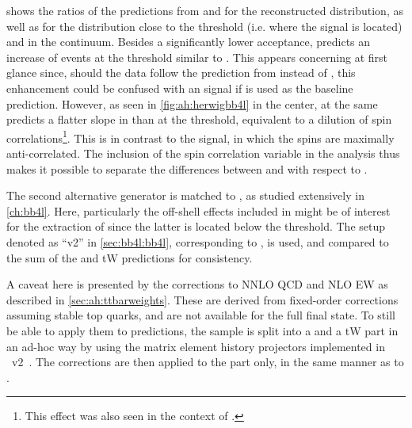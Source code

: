  shows the ratios of the predictions from \herwig and \pythia for the reconstructed \mtt distribution, as well as for the \chel distribution close to the \ttbar threshold (i.e. where the \etat signal is located) and in the \ttbar continuum. Besides a significantly lower \ttbar acceptance, \herwig predicts an increase of events at the \ttbar threshold similar to \etat.
This appears concerning at first glance since, should the data follow the prediction from \herwig instead of \pythia, this enhancement could be confused with an \etat signal if \pythia is used as the baseline prediction.
However, as seen in \cref{fig:ah:herwigbb4l} in the center, \herwig at the same predicts a flatter slope in \chel than \pythia at the \ttbar threshold, equivalent to a dilution of \ttbar spin correlations\footnote{This effect was also seen in the context of .}. This is in contrast to the \etat signal, in which the \ttbar spins are maximally anti-correlated. The inclusion of the spin correlation variable \chel in the analysis thus makes it possible to separate the differences between \powheg and \herwig with respect to \etat.

The second alternative generator is \bbfourl matched to \pythia, as studied extensively in \cref{ch:bb4l}. Here, particularly the off-shell effects included in \bbfourl might be of interest for the extraction of \etat since the latter is located below the \ttbar threshold. The setup denoted as ``\bbfourl v2'' in \cref{sec:bb4l:bb4l}, corresponding to , is used, and compared to the sum of the \powheg \hvq \ttbar and tW predictions for consistency.

A caveat here is presented by the corrections to NNLO QCD and NLO EW as described in \cref{sec:ah:ttbarweights}. These are derived from fixed-order corrections assuming stable top quarks, and are not available for the full \bbllnunu final state. To still be able to apply them to \bbfourl predictions, the \bbfourl sample is split into a \ttbar and a tW part in an ad-hoc way by using the matrix element history projectors implemented in \bbfourl~v2~\cite{Jezo:2023rht}. The corrections are then applied to the \ttbar part only, in the same manner as to \powheg \hvq.


